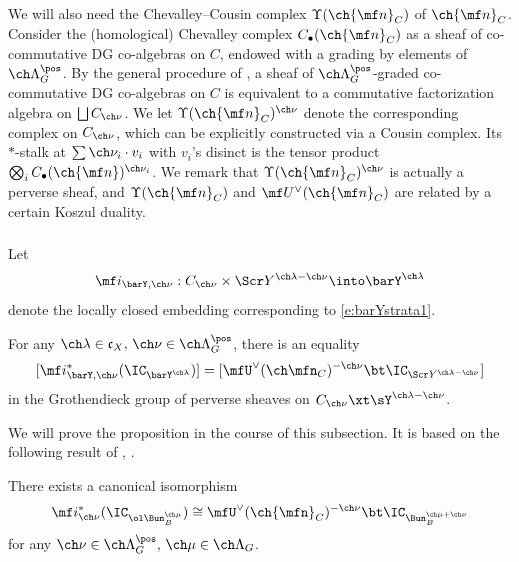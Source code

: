 We will also need the Chevalley--Cousin complex $\Upsilon(\ch{\mf n}_C)$
of $\ch{\mf n}_C$.
Consider the (homological) Chevalley complex $C_\bullet(\ch{\mf n}_C)$
as a sheaf of co-commutative DG co-algebras on $C$, endowed with a grading by elements of
$\ch\Lambda^\pos_G$.
By the general procedure of \cite[\S 3.4]{BD:chiral}, a sheaf of $\ch\Lambda^\pos_G$-graded
co-commutative DG co-algebras on $C$ is equivalent to a commutative factorization algebra
on $\bigsqcup C_{\ch\nu}$. We let $\Upsilon(\ch{\mf n}_C)^{\ch\nu}$ denote
the corresponding complex on $C_{\ch\nu}$, which can be explicitly constructed
via a Cousin complex.
Its $*$-stalk at $\sum \ch\nu_i \cdot v_i$ with $v_i$'s disinct is
the tensor product $\bigotimes_i C_\bullet(\ch{\mf n})^{\ch\nu_i}$.
We remark that $\Upsilon(\ch{\mf n}_C)^{\ch\nu}$ is actually
a perverse sheaf, and $\Upsilon(\ch{\mf n}_C)$ and $\mf U^\vee(\ch{\mf n}_C)$ are
related by a certain Koszul duality.


\subsubsection{} Let
\[ \mf i_{\barY,\ch\nu} : C_{\ch\nu} \times \Scr Y^{\ch\lambda-\ch\nu}
\into \barY^{\ch\lambda} \]
denote the locally closed embedding corresponding to \eqref{e:barYstrata1}.

\begin{prop}
\notready \label{prop:ICbarY}
For any $\ch\lambda\in \mathfrak c_X,\, \ch\nu\in \ch\Lambda^\pos_G$,
there is an equality
\[
[\mf i^*_{\barY,\ch\nu}(\IC_{\barY^{\ch\lambda}}) ]
= [\mfU^\vee(\ch\mfn_C)^{-\ch\nu} \bt \IC_{\Scr Y^{\ch\lambda-\ch\nu}}]
\]
in the Grothendieck group of perverse sheaves on $C_{\ch\nu} \xt \sY^{\ch\lambda-\ch\nu}$.
\end{prop}

We will prove the proposition in the course of this subsection. It is based on the following result of {\cite[Proposition 4.4]{BG2}, \cite[Theorem 1.12]{BFGM}}.
\begin{thm}
\notready
\label{thm:BFGM}
There exists a canonical isomorphism
\[ \mf i_{\ch\nu}^* (\IC_{\ol\Bun_B^{\ch\mu}}) \cong
\mfU^\vee(\ch{\mfn}_C)^{-\ch\nu} \bt \IC_{\Bun_B^{\ch\mu+\ch\nu}}
\]
for any $\ch\nu\in \ch\Lambda^\pos_G,\, \ch\mu\in \ch\Lambda_G$.
\end{thm}



